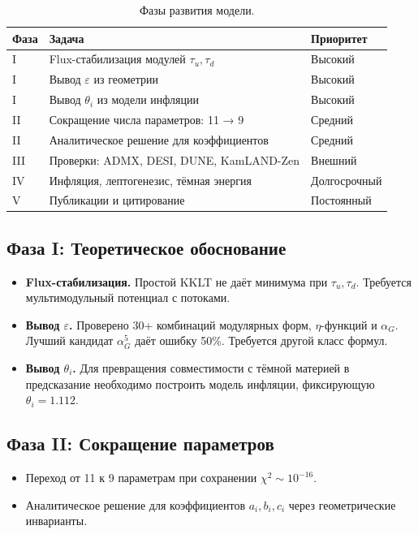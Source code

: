 \documentclass[12pt,a4paper]{article}
\numberwithin{equation}{section}
\begin{document}
\begin{table}[H]
\centering
\caption{Фазы развития модели.}
\begin{tabular}{p{1.5cm}p{8cm}p{3cm}}
\toprule
Фаза & Задача & Приоритет \\
\midrule
I & Flux-стабилизация модулей $\tau_u, \tau_d$ & Высокий \\
I & Вывод $\varepsilon$ из геометрии & Высокий \\
I & Вывод $\theta_i$ из модели инфляции & Высокий \\
II & Сокращение числа параметров: 11 → 9 & Средний \\
II & Аналитическое решение для коэффициентов & Средний \\
III & Проверки: ADMX, DESI, DUNE, KamLAND-Zen & Внешний \\
IV & Инфляция, лептогенезис, тёмная энергия & Долгосрочный \\
V & Публикации и цитирование & Постоянный \\
\bottomrule
\end{tabular}
\end{table}

\subsection{Фаза I: Теоретическое обоснование}

\begin{itemize}[leftmargin=1.5em]
\item \textbf{Flux-стабилизация.} Простой KKLT не даёт минимума 
при $\tau_u, \tau_d$. Требуется мультимодульный потенциал 
с потоками.
\item \textbf{Вывод $\varepsilon$.} Проверено 30+ комбинаций 
модулярных форм, $\eta$-функций и $\alpha_G$. Лучший кандидат 
$\alpha_G^5$ даёт ошибку 50\%. Требуется другой класс формул.
\item \textbf{Вывод $\theta_i$.} Для превращения совместимости 
с тёмной материей в предсказание необходимо построить 
модель инфляции, фиксирующую $\theta_i = 1.112$.
\end{itemize}

\subsection{Фаза II: Сокращение параметров}

\begin{itemize}[leftmargin=1.5em]
\item Переход от 11 к 9 параметрам при сохранении 
$\chi^2 \sim 10^{-16}$.
\item Аналитическое решение для коэффициентов $a_i, b_i, c_i$ 
через геометрические инварианты.
\end{itemize}
\end{document}
